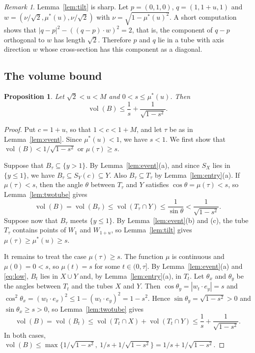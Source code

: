 \documentclass[11pt]{amsart}
\newtheorem{proposition}[theorem]{Proposition}
\theoremstyle{definition}
\theoremstyle{remark}
\newtheorem{remark}[theorem]{Remark}
\numberwithin{equation}{section}
\newcommand{\vol}{\operatorname{vol}}
\begin{document}
\begin{remark}\label{rem:tilt}
Lemma~\ref{lem:tilt} is sharp. Let $p=(0,1,0)$, $q=(1,1+u,1)$ and $w=(\nu/\sqrt2,\mu^*(u),\nu/\sqrt2)$ with $\nu=\sqrt{1-\mu^*(u)^2}$. A short computation shows that $|q-p|^2-((q-p)\cdot w)^2=2$, that is, the component of $q-p$ orthogonal to $w$ has length $\sqrt2$. Therefore $p$ and $q$ lie in a tube with axis direction $w$ whose cross-section has this component as a diagonal.
\end{remark}

\subsection{The volume bound}

\begin{proposition}\label{prop:pose}
Let $\sqrt2<u<M$ and $0<s\le\mu^*(u)$. Then
\[
\vol(B)\le\frac1s+\frac1{\sqrt{1-s^2}}.
\]
\end{proposition}

\begin{proof}
Put $c=1+u$, so that $1<c<1+M$, and let $\tau$ be as in Lemma~\ref{lem:event}. Since $\mu^*(u)<1$, we have $s<1$. We first show that $\vol(B)<1/\sqrt{1-s^2}$ or $\mu(\tau)\ge s$.

Suppose that $B_\tau\subseteq\{y>1\}$. By Lemma~\ref{lem:event}(a), and since $S_X$ lies in $\{y\le1\}$, we have $B_\tau\subseteq S_Y(c)\subseteq Y$. Also $B_\tau\subseteq T_\tau$ by Lemma~\ref{lem:entry}(a). If $\mu(\tau)<s$, then the angle $\theta$ between $T_\tau$ and $Y$ satisfies $\cos\theta=\mu(\tau)<s$, so Lemma~\ref{lem:twotube} gives
\[
\vol(B)=\vol(B_\tau)\le\vol(T_\tau\cap Y)\le\frac1{\sin\theta}<\frac1{\sqrt{1-s^2}}.
\]
Suppose now that $B_\tau$ meets $\{y\le1\}$. By Lemma~\ref{lem:event}(b) and (c), the tube $T_\tau$ contains points of $W_1$ and $W_{1+u}$, so Lemma~\ref{lem:tilt} gives $\mu(\tau)\ge\mu^*(u)\ge s$.

It remains to treat the case $\mu(\tau)\ge s$. The function $\mu$ is continuous and $\mu(0)=0<s$, so $\mu(t)=s$ for some $t\in(0,\tau]$. By Lemma~\ref{lem:event}(a) and \eqref{eq:low}, $B_t$ lies in $X\cup Y$ and, by Lemma~\ref{lem:entry}(a), in $T_t$. Let $\theta_x$ and $\theta_y$ be the angles between $T_t$ and the tubes $X$ and $Y$. Then $\cos\theta_y=|w_t\cdot e_y|=s$ and $\cos^2\theta_x=(w_t\cdot e_x)^2\le1-(w_t\cdot e_y)^2=1-s^2$. Hence $\sin\theta_y=\sqrt{1-s^2}>0$ and $\sin\theta_x\ge s>0$, so Lemma~\ref{lem:twotube} gives
\[
\vol(B)=\vol(B_t)\le\vol(T_t\cap X)+\vol(T_t\cap Y)\le\frac1s+\frac1{\sqrt{1-s^2}}.
\]
In both cases, $\vol(B)\le\max\bigl\{1/\sqrt{1-s^2},\ 1/s+1/\sqrt{1-s^2}\bigr\}=1/s+1/\sqrt{1-s^2}$.
\end{proof}
\end{document}
